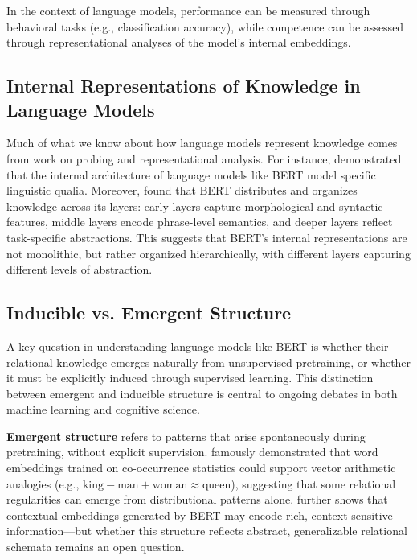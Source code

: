 \documentclass[stu,floatsintext]{apa7}
\begin{document}
In the context of language models, performance can be measured through behavioral tasks (e.g., classification accuracy), while competence can be assessed through representational analyses of the model's internal embeddings.

\subsection{Internal Representations of Knowledge in Language Models}

Much of what we know about how language models represent knowledge comes from work on probing and representational analysis. For instance, \cite{tenney-etal-2019-bert} demonstrated that the internal architecture of language models like BERT model specific linguistic qualia. Moreover, \cite{liu-etal-2019-linguistic} found that BERT distributes and organizes knowledge across its layers: early layers capture morphological and syntactic features, middle layers encode phrase-level semantics, and deeper layers reflect task-specific abstractions. This suggests that BERT's internal representations are not monolithic, but rather organized hierarchically, with different layers capturing different levels of abstraction.

\subsection{Inducible vs. Emergent Structure}

A key question in understanding language models like BERT is whether their relational knowledge emerges naturally from unsupervised pretraining, or whether it must be explicitly induced through supervised learning. This distinction between emergent and inducible structure is central to ongoing debates in both machine learning and cognitive science.

\textbf{Emergent structure} refers to patterns that arise spontaneously during pretraining, without explicit supervision. \textcite{Mikolov2013} famously demonstrated that word embeddings trained on co-occurrence statistics could support vector arithmetic analogies (e.g., $\text{king} - \text{man} + \text{woman} \approx \text{queen}$), suggesting that some relational regularities can emerge from distributional patterns alone. \textcite{ethayarajh-2019-contextual} further shows that contextual embeddings generated by BERT may encode rich, context-sensitive information—but whether this structure reflects abstract, generalizable relational schemata remains an open question.
\end{document}
